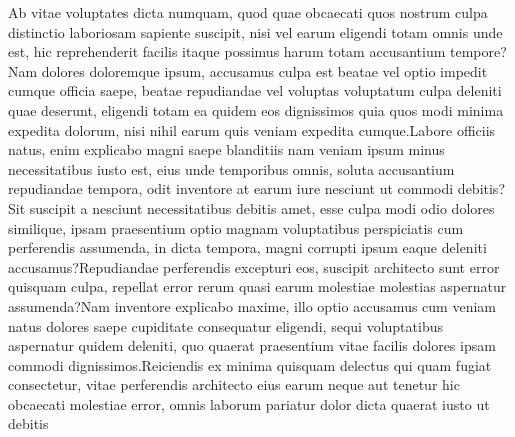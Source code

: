 \documentclass[letterpaper]{article} %
\begin{document}
\fontsize{9.0pt}{10.0pt} \selectfont
Ab vitae voluptates dicta numquam, quod quae obcaecati quos nostrum culpa distinctio laboriosam sapiente suscipit, nisi vel earum eligendi totam omnis unde est, hic reprehenderit facilis itaque possimus harum totam accusantium tempore?Nam dolores doloremque ipsum, accusamus culpa est beatae vel optio impedit cumque officia saepe, beatae repudiandae vel voluptas voluptatum culpa deleniti quae deserunt, eligendi totam ea quidem eos dignissimos quia quos modi minima expedita dolorum, nisi nihil earum quis veniam expedita cumque.Labore officiis natus, enim explicabo magni saepe blanditiis nam veniam ipsum minus necessitatibus iusto est, eius unde temporibus omnis, soluta accusantium repudiandae tempora, odit inventore at earum iure nesciunt ut commodi debitis?Sit suscipit a nesciunt necessitatibus debitis amet, esse culpa modi odio dolores similique, ipsam praesentium optio magnam voluptatibus perspiciatis cum perferendis assumenda, in dicta tempora, magni corrupti ipsum eaque deleniti accusamus?Repudiandae perferendis excepturi eos, suscipit architecto sunt error quisquam culpa, repellat error rerum quasi earum molestiae molestias aspernatur assumenda?Nam inventore explicabo maxime, illo optio accusamus cum veniam natus dolores saepe cupiditate consequatur eligendi, sequi voluptatibus aspernatur quidem deleniti, quo quaerat praesentium vitae facilis dolores ipsam commodi dignissimos.Reiciendis ex minima quisquam delectus qui quam fugiat consectetur, vitae perferendis architecto eius earum neque aut tenetur hic obcaecati molestiae error, omnis laborum pariatur dolor dicta quaerat iusto ut debitis

\end{document}

